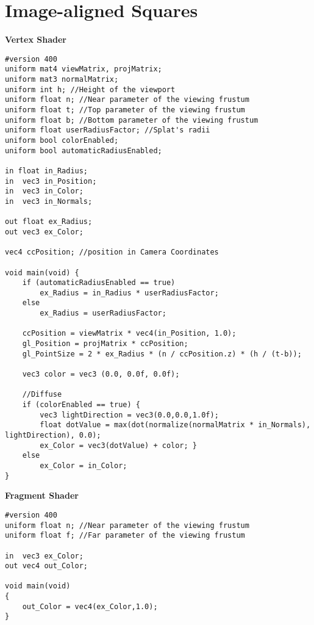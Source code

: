 \section{Image-aligned Squares}
\textbf{Vertex Shader}
\begin{lstlisting}[frame=single]
#version 400
uniform mat4 viewMatrix, projMatrix;
uniform mat3 normalMatrix;
uniform int h; //Height of the viewport
uniform float n; //Near parameter of the viewing frustum
uniform float t; //Top parameter of the viewing frustum
uniform float b; //Bottom parameter of the viewing frustum
uniform float userRadiusFactor; //Splat's radii
uniform bool colorEnabled;
uniform bool automaticRadiusEnabled;

in float in_Radius;
in  vec3 in_Position;
in  vec3 in_Color;
in 	vec3 in_Normals;

out float ex_Radius;
out vec3 ex_Color;

vec4 ccPosition; //position in Camera Coordinates

void main(void) {
	if (automaticRadiusEnabled == true)
		ex_Radius = in_Radius * userRadiusFactor;
	else
		ex_Radius = userRadiusFactor;

	ccPosition = viewMatrix * vec4(in_Position, 1.0);
	gl_Position = projMatrix * ccPosition;
	gl_PointSize = 2 * ex_Radius * (n / ccPosition.z) * (h / (t-b));

	vec3 color = vec3 (0.0, 0.0f, 0.0f);

	//Diffuse
	if (colorEnabled == true) {
		vec3 lightDirection = vec3(0.0,0.0,1.0f);
		float dotValue = max(dot(normalize(normalMatrix * in_Normals), lightDirection), 0.0);
		ex_Color = vec3(dotValue) + color; }
	else
		ex_Color = in_Color;
}
\end{lstlisting}

\textbf{Fragment Shader}
\begin{lstlisting}[frame=single]
#version 400
uniform float n; //Near parameter of the viewing frustum
uniform float f; //Far parameter of the viewing frustum

in  vec3 ex_Color;
out vec4 out_Color;

void main(void)
{	
	out_Color = vec4(ex_Color,1.0);
}
\end{lstlisting}
\vfill


